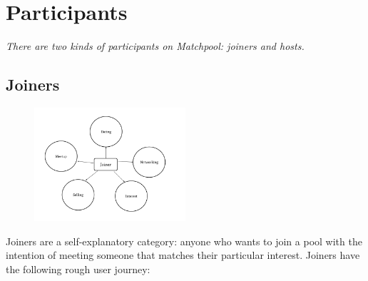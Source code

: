 \documentclass[a4paper]{article}
\begin{document}
\section{Participants}
\textit{There are two kinds of participants on Matchpool: joiners and hosts. }

\subsection{Joiners}

\begin{figure}[!ht]
\centering
\includegraphics[width=0.5\textwidth]{pools.png}
\end{figure}

Joiners are a self-explanatory category: anyone who wants to join a pool with the intention of meeting someone that matches their particular interest. Joiners have the following rough user journey:
\end{document}

